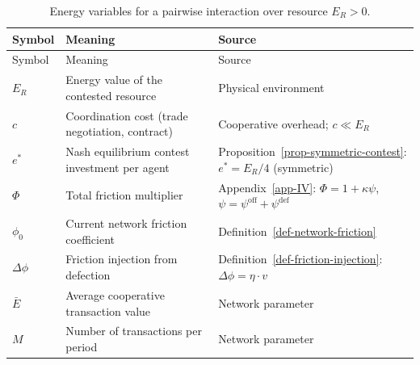 \documentclass[11pt]{article}
\theoremstyle{plain}
\theoremstyle{definition}
\theoremstyle{remark}
\begin{document}
\begin{longtable}[]{@{}
  >{\raggedright\arraybackslash}p{}
  >{\raggedright\arraybackslash}p{}
  >{\raggedright\arraybackslash}p{}@{}}
\caption{Energy variables for a pairwise interaction over resource
\(E_R > 0\).}\tabularnewline
\toprule\noalign{}
\begin{minipage}[b]{\linewidth}\raggedright
Symbol
\end{minipage} & \begin{minipage}[b]{\linewidth}\raggedright
Meaning
\end{minipage} & \begin{minipage}[b]{\linewidth}\raggedright
Source
\end{minipage} \\
\midrule\noalign{}
\endfirsthead
\toprule\noalign{}
\begin{minipage}[b]{\linewidth}\raggedright
Symbol
\end{minipage} & \begin{minipage}[b]{\linewidth}\raggedright
Meaning
\end{minipage} & \begin{minipage}[b]{\linewidth}\raggedright
Source
\end{minipage} \\
\midrule\noalign{}
\endhead
\bottomrule\noalign{}
\endlastfoot
\(E_R\) & Energy value of the contested resource & Physical
environment \\
\(c\) & Coordination cost (trade negotiation, contract) & Cooperative
overhead; \(c \ll E_R\) \\
\(e^*\) & Nash equilibrium contest investment per agent &
Proposition~\ref{prop-symmetric-contest}: \(e^* = E_R/4\) (symmetric) \\
\(\Phi\) & Total friction multiplier & Appendix~\ref{app-IV}:
\(\Phi = 1 + \kappa\psi\),
\(\psi = \psi^{\text{off}} + \psi^{\text{def}}\) \\
\(\phi_0\) & Current network friction coefficient &
Definition~\ref{def-network-friction} \\
\(\Delta\phi\) & Friction injection from defection &
Definition~\ref{def-friction-injection}:
\(\Delta\phi = \eta \cdot v\) \\
\(\bar{E}\) & Average cooperative transaction value & Network
parameter \\
\(M\) & Number of transactions per period & Network parameter \\
\end{longtable}
\end{document}
